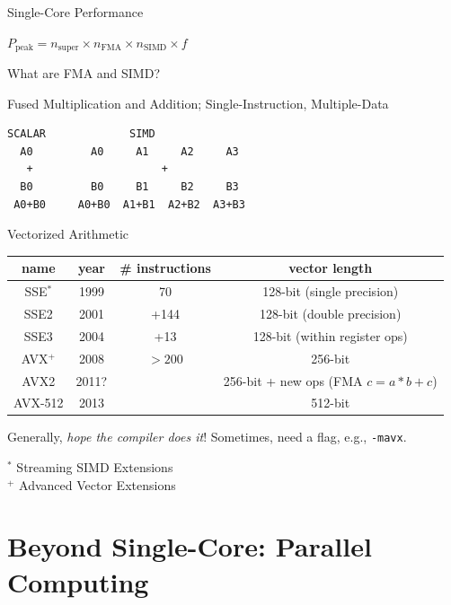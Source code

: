 \documentclass[10pt]{beamer}
\begin{document}
\begin{frame}[fragile]{Single-Core Performance}

$P_{\text{peak}} = n_{\text{super}}  \times n_{\text{FMA}} \times n_{\text{SIMD}} \times f$

\vfill 

What are FMA and SIMD?  

\pause 

Fused Multiplication and Addition;  Single-Instruction, Multiple-Data

\vfill 

\begin{verbatim}
SCALAR             SIMD
  A0         A0     A1     A2     A3
   +                    +
  B0         B0     B1     B2     B3
 A0+B0     A0+B0  A1+B1  A2+B2  A3+B3
\end{verbatim}



\end{frame}


\begin{frame}[fragile]{Vectorized Arithmetic}

\begin{tabular}{cccc}
 name     & year & \# instructions & vector length \\
 \hline
 SSE$^*$  & 1999 &  70             & 128-bit (single precision) \\
 SSE2     & 2001 &  +144            & 128-bit (double precision) \\
 SSE3     & 2004 &  +13             & 128-bit (within register ops) \\
 AVX$^+$  & 2008 &  $>200$         & 256-bit  \\
 AVX2     & 2011? &                & 256-bit + new ops (FMA $c = a*b+c$) \\
 AVX-512  & 2013 &                 & 512-bit 
\end{tabular}

\vfill 

Generally, {\it hope the compiler does it}!  Sometimes, need a flag, 
e.g., {\tt -mavx}.

\vfill
$^*$ Streaming SIMD Extensions \\
$^+$ Advanced Vector Extensions 
\end{frame}



\section{Beyond Single-Core: Parallel Computing}
\end{document}
